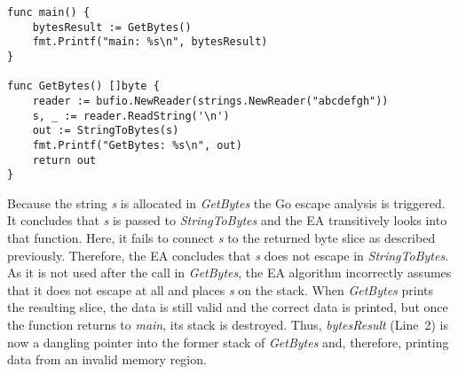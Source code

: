 \begin{lstlisting}[language=Golang, label=lst:escape-analysis, caption=Escape analysis flaw example, float, belowskip=-1.5em]
func main() {
	bytesResult := GetBytes()
	fmt.Printf("main: %s\n", bytesResult)
}

func GetBytes() []byte {
	reader := bufio.NewReader(strings.NewReader("abcdefgh"))
	s, _ := reader.ReadString('\n')
	out := StringToBytes(s)
	fmt.Printf("GetBytes: %s\n", out)
	return out
}
\end{lstlisting}



Because the string \textit{s} is allocated in \textit{GetBytes} the Go escape analysis is triggered. %
It concludes that \textit{s} is passed to \textit{StringToBytes} and the EA transitively looks into that function.
Here, it fails to connect \textit{s} to the returned byte slice as described previously.
Therefore, the EA concludes that \textit{s} does not escape in \textit{StringToBytes}.
As it is not used after the call in \textit{GetBytes}, the EA algorithm incorrectly assumes that it does not escape at all and places \textit{s} on the stack.
When \textit{GetBytes} prints the resulting slice, the data is still valid and the correct data is printed, but once the function returns to \textit{main}, its stack is destroyed.
Thus, \textit{bytesResult} (Line~2) is now a dangling pointer into the former stack of \textit{GetBytes} and, therefore, printing data from an invalid memory region.


%
%


